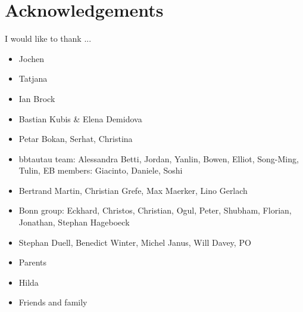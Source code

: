 \chapter*{Acknowledgements}
\label{sec:ack}

I would like to thank ...

\begin{itemize}

\item Jochen

\item Tatjana

\item Ian Brock

\item Bastian Kubis \& Elena Demidova

\item Petar Bokan, Serhat, Christina

\item bbtautau team: Alessandra Betti, Jordan, Yanlin, Bowen, Elliot, Song-Ming,
  Tulin, EB members: Giacinto, Daniele, Soshi

\item Bertrand Martin, Christian Grefe, Max Maerker, Lino Gerlach

\item Bonn group: Eckhard, Christos, Christian, Ogul, Peter, Shubham, Florian,
  Jonathan, Stephan Hageboeck

\item Stephan Duell, Benedict Winter, Michel Janus, Will Davey, PO

\item Parents

\item Hilda

\item Friends and family

\end{itemize}

